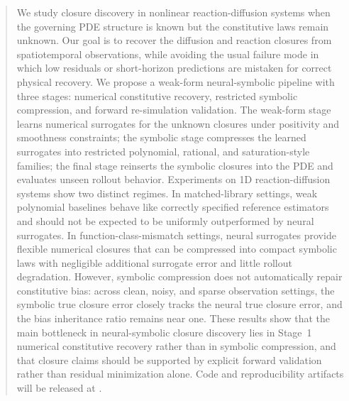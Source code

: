 \begin{abstract}
We study closure discovery in nonlinear reaction-diffusion systems when the governing PDE structure is known but the constitutive laws remain unknown. Our goal is to recover the diffusion and reaction closures from spatiotemporal observations, while avoiding the usual failure mode in which low residuals or short-horizon predictions are mistaken for correct physical recovery. We propose a weak-form neural-symbolic pipeline with three stages: numerical constitutive recovery, restricted symbolic compression, and forward re-simulation validation. The weak-form stage learns numerical surrogates for the unknown closures under positivity and smoothness constraints; the symbolic stage compresses the learned surrogates into restricted polynomial, rational, and saturation-style families; the final stage reinserts the symbolic closures into the PDE and evaluates unseen rollout behavior. Experiments on 1D reaction-diffusion systems show two distinct regimes. In matched-library settings, weak polynomial baselines behave like correctly specified reference estimators and should not be expected to be uniformly outperformed by neural surrogates. In function-class-mismatch settings, neural surrogates provide flexible numerical closures that can be compressed into compact symbolic laws with negligible additional surrogate error and little rollout degradation. However, symbolic compression does not automatically repair constitutive bias: across clean, noisy, and sparse observation settings, the symbolic true closure error closely tracks the neural true closure error, and the bias inheritance ratio remains near one. These results show that the main bottleneck in neural-symbolic closure discovery lies in Stage~1 numerical constitutive recovery rather than in symbolic compression, and that closure claims should be supported by explicit forward validation rather than residual minimization alone.
Code and reproducibility artifacts will be released at \codeurl.
\end{abstract}
